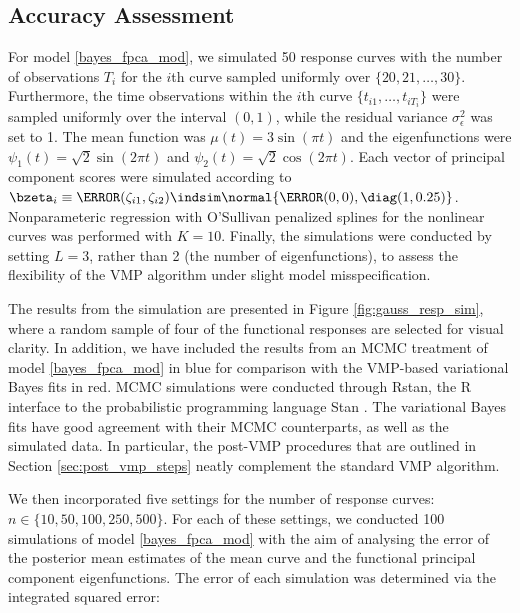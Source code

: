 \documentclass[12pt]{article}
\def\sigsqeps{\sigma^2_{\epsilon}}
\theoremstyle{plain}
\theoremstyle{definition}
\theoremstyle{remark}
\begin{document}

\subsection{Accuracy Assessment}
\label{sec:acc_ass}

For model \eqref{bayes_fpca_mod}, we simulated 50 response curves with the number
of observations $T_i$ for the $i$th curve sampled uniformly over $\{ 20, 21, \dots, 30 \}$. Furthermore, the time
observations within the $i$th curve $\{ t_{i1}, \dots, t_{i T_i} \}$ were sampled uniformly over the interval $(0, 1)$,
while the residual variance $\sigsqeps$ was set to 1. The mean function was $\mu (t) = 3 \sin (\pi t)$
and the eigenfunctions were $\psi_1 (t) = \sqrt{2} \sin (2 \pi t)$ and $\psi_2 (t) = \sqrt{2} \cos (2 \pi t)$.
Each vector of principal component scores were simulated according to
$\bzeta_i \equiv \T{(\zeta_{i1}, \zeta_{i2})} \indsim \normal \{ \T{(0, 0)}, \diag(1, 0.25) \}$.
Nonparameteric regression with O'Sullivan penalized splines for the nonlinear curves was performed
with $K = 10$. Finally, the simulations were conducted by setting $L = 3$, rather
than 2 (the number of eigenfunctions), to assess the flexibility of the VMP algorithm under slight model misspecification.

The results from the simulation are presented in Figure \ref{fig:gauss_resp_sim}, where a random sample of
four of the functional responses are selected for visual clarity. In addition, we have included the results from an MCMC
treatment of model \eqref{bayes_fpca_mod} in blue for comparison with
the VMP-based variational Bayes fits in red.
MCMC simulations were conducted through \textsf{Rstan}, the \textsf{R} \cite{r20} interface to the probabilistic
programming language \textsf{Stan} \cite{rstan20}.
The variational Bayes fits have good agreement with their MCMC
counterparts, as well as the simulated data.
In particular, the post-VMP procedures that are outlined in Section \ref{sec:post_vmp_steps} neatly
complement the standard VMP algorithm.

We then incorporated five settings for the number of response curves: $n \in \{ 10, 50, 100, 250, 500 \}$. For each of these
settings, we conducted 100 simulations of model \eqref{bayes_fpca_mod} with the aim of analysing the error of
the posterior mean estimates of the mean curve and the functional principal
component eigenfunctions. The error of each simulation was determined via the
integrated squared error:
\end{document}
